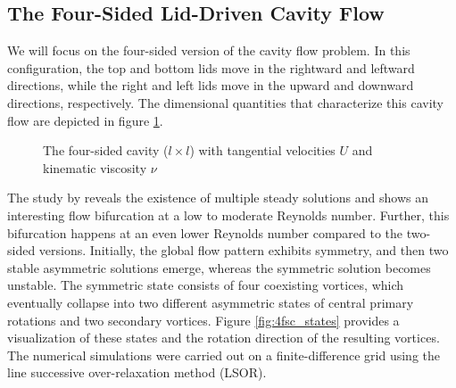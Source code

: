 \subsection{The Four-Sided Lid-Driven Cavity Flow} \label{sec:4sc}

We will focus on the four-sided version of the cavity flow problem. In this
configuration, the top and bottom lids move in the rightward and leftward
directions, while the right and left lids move in the upward and downward
directions, respectively. The dimensional quantities that characterize this
cavity flow are depicted in figure \ref{fig:cav_4s}.

\begin{figure}[ht]
\centering
{}
\caption{The four-sided cavity ($l \times l$) with tangential velocities $U$
  and kinematic viscosity $\nu$ }
\label{fig:cav_4s}
\end{figure}

The study by \citet{wahba2009} reveals the existence of multiple steady
solutions and shows an interesting flow bifurcation at a low to moderate
Reynolds number. Further, this bifurcation happens at an even lower Reynolds
number compared to the two-sided versions. Initially, the global flow pattern
exhibits symmetry, and then two stable asymmetric solutions emerge, whereas the
symmetric solution becomes unstable. The symmetric state consists of four
coexisting vortices, which eventually collapse into two different asymmetric
states of central primary rotations and two secondary vortices. Figure
\ref{fig:4fsc_states} provides a visualization of these states and the rotation
direction of the resulting vortices. The numerical simulations were carried out
on a finite-difference grid using the line successive over-relaxation method
(LSOR). \\

